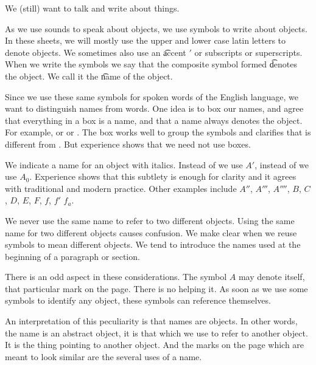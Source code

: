 

We (still) want to talk and write about things.


As we use sounds to speak about objects, we use symbols to write about objects.
In these sheets, we will mostly use the upper and lower case latin letters to denote objects.
We sometimes also use an \t{accent} $'$ or subscripts or superscripts.
When we write the symbols we say that the composite symbol formed \t{denotes} the object.
We call it the \t{name} of the object.

Since we use these same symbols for spoken words of the English language, we want to distinguish names from words.
One idea is to box our names, and agree that everything in a box is a name, and that a name always denotes the object.
For example,  or  or .
The box works well to group the symbols and clarifies that  is different from .
But experience shows that we need not use boxes.

We indicate a name for an object with italics.
Instead of  we use $A'$, instead of  we use $A_0$.
Experience shows that this subtlety is enough for clarity and it agrees with traditional and modern practice.
Other examples include $A''$, $A'''$, $A''''$, $B$, $C$, $D$, $E$, $F$, $f$, $f'$ $f_a$.



We never use the same name to refer to two different objects.
Using the same name for two different objects causes confusion.
We make clear when we reuse symbols to mean different objects.
We tend to introduce the names used at the beginning of a paragraph or section.


There is an odd aspect in these considerations.
The symbol $A$ may denote itself, that particular mark on the page.
There is no helping it.
As soon as we use some symbols to identify any object, these symbols can reference themselves.

An interpretation of this peculiarity is that names are objects.
In other words, the name is an abstract object, it is that which we use to refer to another object.
It is the thing pointing to another object.
And the marks on the page which are meant to look similar are the several uses of a name.


